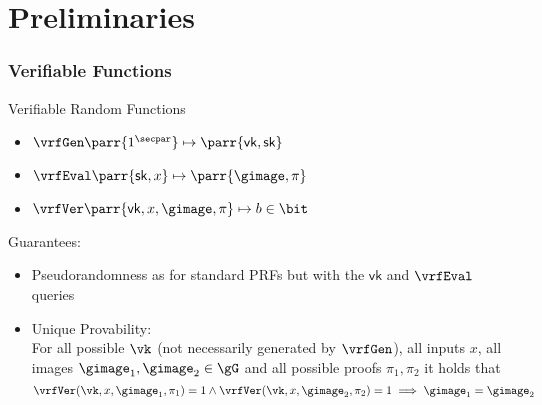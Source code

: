 \section{Preliminaries}

\begin{frame}
    \frametitle{Verifiable Functions}
    \begin{block}{Verifiable Random Functions}
        \begin{itemize}
            \item \(\vrfGen\parr{1^\secpar} \mapsto \parr{\mathsf{vk}, \mathsf{sk}}\)
            \item \(\vrfEval\parr{\mathsf{sk}, x} \mapsto \parr{\gimage, \pi}\)
            \pause
            \item \(\vrfVer\parr{\mathsf{vk}, x, \gimage, \pi} \mapsto b \in \bit\)
        \end{itemize}
        \pause
        Guarantees:
        \begin{itemize}
            \item Pseudorandomness as for standard PRFs but with the \(\mathsf{vk}\) and \(\vrfEval\) queries
            \pause
            \item Unique Provability:
            \\
            For all possible \(\vk\) (not necessarily generated by \(\vrfGen\)),
            all inputs \(x\),
            all images \(\gimage_1,\gimage_2 \in \gG\) and
            all possible proofs \(\pi_1,\pi_2\) it holds that
            \[\vrfVer(\vk,x,\gimage_1,\pi_1) = 1 \land \vrfVer(\vk,x,\gimage_2,\pi_2) = 1 \implies \gimage_1 = \gimage_2\]
        \end{itemize}
    \end{block}
\end{frame}

